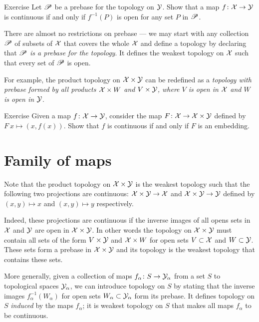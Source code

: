 \begin{thm}{Exercise}\label{ex:prebase}
Let $\mathscr{P}$ be a prebase for the topology on $\mathcal{Y}$.
Show that a map $f\colon \mathcal{X} \to \mathcal{Y}$ is continuous if and only if $f^{-1}(P)$ is open for any set $P$ in $\mathscr{P}$.

\end{thm}

There are almost no restrictions on prebase --- we may start with any collection $\mathscr{P}$ of subsets of $\mathcal{X}$ that covers the whole $\mathcal{X}$ and define a topology by declaring that \textit{$\mathscr{P}$ is a prebase for the topology}.
It defines the weakest topology on $\mathcal{X}$ such that every set of $\mathscr{P}$ is open.

For example, the product topology on $\mathcal{X}\times\mathcal{Y}$ can be redefined as a \textit{topology with prebase formed by all products $\mathcal{X}\times W$ and $V\times \mathcal{Y}$, where $V$ is open in $\mathcal{X}$ and $W$ is open in $\mathcal{Y}$}.


\begin{thm}{Exercise}\label{ex:graph}
Given a map $f\:\c{X}\z\to \c{Y}$, consider the map $F\:\c{X}\z\to \c{X}\times\c{Y}$ defined by $F\:x\mapsto (x,f(x))$.
Show that $f$ is continuous if and only if $F$ is an embedding.
\end{thm}

\section{Family of maps}\label{induced-family}

Note that the product topology on $\mathcal{X}\times\mathcal{Y}$ is the weakest topology such that the following two projections are continuous:
$\mathcal{X}\times\mathcal{Y}\to \mathcal{X}$ and $\mathcal{X}\times\mathcal{Y}\to \mathcal{Y}$ defined by $(x,y)\mapsto x$ and $(x,y)\mapsto y$ respectively.

Indeed, these projections are continuous if the inverse images of all opens sets in $\mathcal{X}$ and $\mathcal{Y}$ are open in $\mathcal{X}\times\mathcal{Y}$.
In other words the topology on $\mathcal{X}\times\mathcal{Y}$ must contain all sets of the form $V\times \mathcal{Y}$ and $\mathcal{X}\times W$ for open sets $V\subset \mathcal{X}$ and $W\subset \mathcal{Y}$.
These sets form a prebase in $\mathcal{X}\times\mathcal{Y}$ and its topology is the weakest topology  that contains these sets.

More generally, given a collection of maps $f_\alpha\colon S\to \mathcal{Y}_\alpha$ from a set $S$ to topological spaces $\mathcal{Y}_\alpha$, we can introduce topology on $S$ by stating that the inverse images $f^{-1}_\alpha(W_\alpha)$ for open sets $W_\alpha\subset\mathcal{Y}_\alpha$ form its prebase.
It defines topology on $S$ \emph{induced} by the maps $f_\alpha$;
it is weakest topology on $S$ that makes all maps $f_\alpha$ to be continuous.

